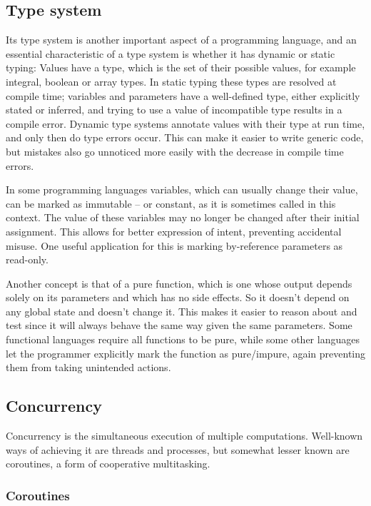 		\subsection{Type system}
		Its type system is another important aspect of a programming language, and an essential characteristic of a type system is whether it has dynamic or static typing: Values have a type, which is the set of their possible values, for example integral, boolean or array types. In static typing these types are resolved at compile time; variables and parameters have a well-defined type, either explicitly stated or inferred, and trying to use a value of incompatible type results in a compile error.
		Dynamic type systems annotate values with their type at run time, and only then do type errors occur. This can make it easier to write generic code, but mistakes also go unnoticed more easily with the decrease in compile time errors.
		
		In some programming languages variables, which can usually change their value, can be marked as immutable -- or constant, as it is sometimes called in this context. The value of these variables may no longer be changed after their initial assignment. This allows for better expression of intent, preventing accidental misuse. One useful application for this is marking by-reference parameters as read-only.
		
		Another concept is that of a pure function, which is one whose output depends solely on its parameters and which has no side effects. So it doesn't depend on any global state and doesn't change it. This makes it easier to reason about and test since it will always behave the same way given the same parameters. Some functional languages require all functions to be pure, while some other languages let the programmer explicitly mark the function as pure/impure, again preventing them from taking unintended actions.
		
		\subsection{Concurrency}
		
		Concurrency is the simultaneous execution of multiple computations. Well-known ways of achieving it are threads and processes, but somewhat lesser known are coroutines, a form of cooperative multitasking.
		
		\subsubsection{Coroutines}
		
